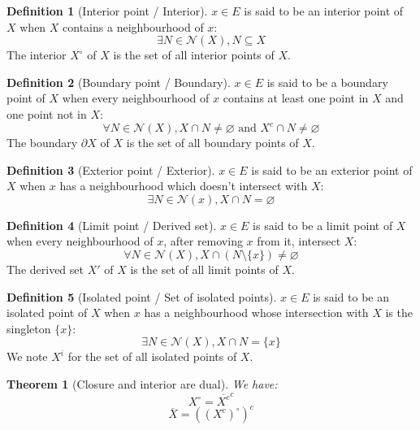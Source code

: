 \documentclass{article}
\newtheorem{theorem}{Theorem}[section]
\theoremstyle{definition}
\newtheorem{definition}{Definition}[section]
\theoremstyle{remark}
\theoremstyle{example}
\theoremstyle{notation}
\newcommand{\inter}[1]{{{#1}^\circ}}
\newcommand{\tand}{\text{ and }}
\begin{document}
\begin{definition}[Interior point / Interior]
		$x \in E$ is said to be an interior point of $X$ when $X$ contains a neighbourhood of $x$:
				$$\exists N \in \mathcal{N}(X), N \subseteq X$$
		The interior $\inter{X}$ of $X$ is the set of all interior points of $X$.
\end{definition}

\begin{definition}[Boundary point / Boundary]
		$x \in E$ is said to be a boundary point of $X$ when every neighbourhood of $x$ contains at least one point in $X$ and one point not in $X$:
				$$\forall N \in \mathcal{N}(X), X \cap N \neq \varnothing \tand X^c \cap N \neq \varnothing$$
		The boundary $\partial X$ of $X$ is the set of all boundary points of $X$.
\end{definition}

\begin{definition}[Exterior point / Exterior]
		$x \in E$ is said to be an exterior point of $X$ when $x$ has a neighbourhood which doesn't intersect with $X$:
				$$\exists N \in \mathcal{N}(x), X \cap N = \varnothing$$
\end{definition}

\begin{definition}[Limit point / Derived set]
		$x \in E$ is said to be a limit point of $X$ when every neighbourhood of $x$, after removing $x$ from it, intersect $X$:
				$$\forall N \in \mathcal{N}(X), X \cap (N \setminus \{x\}) \neq \varnothing$$
		The derived set $X'$ of $X$ is the set of all limit points of $X$.
\end{definition}

\begin{definition}[Isolated point / Set of isolated points]
		$x \in E$ is said to be an isolated point of $X$ when $x$ has a neighbourhood whose intersection with $X$ is the singleton $\{x\}$:
				$$\exists N \in \mathcal{N}(X), X \cap N = \{x\}$$
		We note $X^i$ for the set of all isolated points of $X$.
\end{definition}

\begin{theorem}[Closure and interior are dual]
		We have:
				$$\inter{X} = \overline{X^c}^c$$
				$$\overline{X} = (\inter{(X^c)})^c$$
\end{theorem}
\end{document}
